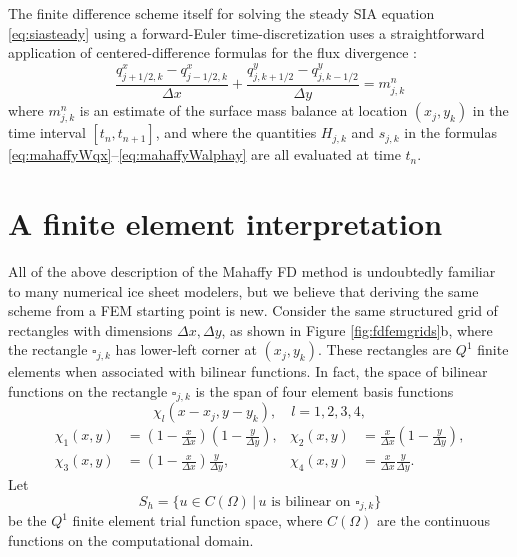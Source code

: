 \documentclass[11pt]{amsart}
\begin{document}
The finite difference scheme itself for solving the steady SIA equation \eqref{eq:siasteady} using a forward-Euler time-discretization uses a straightforward application of centered-difference formulas for the flux divergence \cite{MortonMayers2005}:
\begin{equation}
\frac{q^x_{j+1/2,k} - q^x_{j-1/2,k}}{\Delta x} + \frac{q^y_{j,k+1/2}- q^y_{j,k-1/2}}{\Delta y} = m_{j,k}^n
\end{equation}
where $m_{j,k}^n$ is an estimate of the surface mass balance at location $(x_j,y_k)$ in the time interval $[t_n,t_{n+1}]$, and where the quantities $H_{j,k}$ and $s_{j,k}$ in the formulas \eqref{eq:mahaffyWqx}--\eqref{eq:mahaffyWalphay} are all evaluated at time $t_n$.


\section{A finite element interpretation}

All of the above description of the Mahaffy FD method is undoubtedly familiar to many numerical ice sheet modelers, but we believe that deriving the same scheme from a FEM starting point is new.  Consider the same structured grid of rectangles with dimensions $\Delta x,\Delta y$, as shown in Figure \ref{fig:fdfemgrids}b, where the rectangle $\square_{j,k}$ has lower-left corner at $(x_j,y_k)$.  These rectangles are $Q^1$ finite elements when associated with bilinear functions.  In fact, the space of bilinear functions on the rectangle $\square_{j,k}$ is the span of four element basis functions
\begin{equation}
\chi_l(x-x_j,y-y_k), \quad l=1,2,3,4,
\end{equation}
\begin{align*}
\chi_1(x,y) &= \left(1-\tfrac{x}{\Delta x}\right) \left(1-\tfrac{y}{\Delta y}\right), & \chi_2(x,y) &= \tfrac{x}{\Delta x} \left(1-\tfrac{y}{\Delta y}\right), \\
\chi_3(x,y) &= \left(1-\tfrac{x}{\Delta x}\right) \tfrac{y}{\Delta y}, & \chi_4(x,y) &= \tfrac{x}{\Delta x} \tfrac{y}{\Delta y}. 
\end{align*}
Let
\begin{equation}
S_h = \{u \in C(\Omega) \,\big|\, u \text{ is bilinear on $\square_{j,k}$}\}
\end{equation}
be the $Q^1$ finite element trial function space, where $C(\Omega)$ are the continuous functions on the computational domain.
\end{document}
